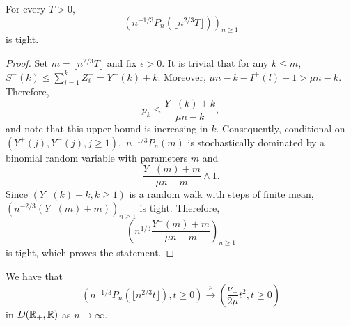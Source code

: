 \begin{lemma}\label{lemma.tightnesssurplusedges}
 For every $T>0$, $$\left(n^{-1/3}P_n\left(\lfloor  n^{2/3}T\rfloor \right) \right)_{n\geq 1}$$ 
 is tight.
 \end{lemma}
 \begin{proof}
Set $m=\lfloor  n^{2/3}T\rfloor$ and fix $\epsilon>0$. It is trivial that for any $k\leq m$, $S^{-}(k)\leq \sum_{i=1}^k Z^-_i=Y^-(k)+k$. Moreover, $\mu n - k -I^{+}(l)+1>\mu n-k$.  Therefore, $$p_k\leq \frac{Y^-(k)+k}{\mu n - k},$$
and note that this upper bound is increasing in $k$. Consequently, conditional on $(Y^+(j),Y^-(j),j\geq 1),$ $n^{-1/3}P_n(m)$ is stochastically dominated by a binomial random variable with parameters  $m$ and $$\frac{Y^-(m)+m}{\mu n - m}\wedge 1.$$
Since $(Y^-(k)+k,k\geq 1)$ is a random walk with steps of finite mean, $\left(n^{-2/3}(Y^-(m)+m)\right)_{n\geq 1}$ is tight. Therefore,
$$\left(n^{1/3} \frac{Y^-(m)+m}{\mu n - m}\right)_{n\geq 1}$$ is tight, which proves the statement.
\end{proof}
\begin{lemma}\label{lemma.convergenceQandP}
We have that 
$$\left(n^{-1/3}P_n(\lfloor n^{2/3}t\rfloor), t \geq 0\right)\overset{p}{\to} \left(\frac{\nu_-}{2\mu} t^2, t\geq 0\right)$$
in $D({\mathbb R}_+,{\mathbb R})$ as $n\to \infty$.

\end{lemma}
